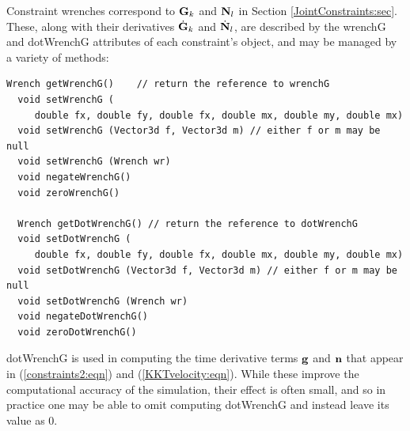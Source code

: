 Constraint wrenches correspond to ${\bf G}_k$ and ${\bf N}_l$ in Section
\ref{JointConstraints:sec}. These, along with their derivatives
$\dot{{\bf G}}_k$ and $\dot{{\bf N}}_l$, are described by the {\sf wrenchG} and {\sf
dotWrenchG} attributes of each constraint's
 object, and may
be managed by a variety of methods:
\begin{lstlisting}[]
  Wrench getWrenchG()    // return the reference to wrenchG
  void setWrenchG (
     double fx, double fy, double fx, double mx, double my, double mx)
  void setWrenchG (Vector3d f, Vector3d m) // either f or m may be null
  void setWrenchG (Wrench wr)
  void negateWrenchG()
  void zeroWrenchG()

  Wrench getDotWrenchG() // return the reference to dotWrenchG
  void setDotWrenchG (
     double fx, double fy, double fx, double mx, double my, double mx)
  void setDotWrenchG (Vector3d f, Vector3d m) // either f or m may be null
  void setDotWrenchG (Wrench wr)
  void negateDotWrenchG()
  void zeroDotWrenchG()
\end{lstlisting}
%

\begin{sideblock}
{\sf dotWrenchG} is used in computing the time derivative terms ${\bf g}$
and ${\bf n}$ that appear in (\ref{constraints2:eqn}) and
(\ref{KKTvelocity:eqn}). While these improve the computational
accuracy of the simulation, their effect is often small, and so in
practice one may be able to omit computing {\sf dotWrenchG} and
instead leave its value as 0.
\end{sideblock}

